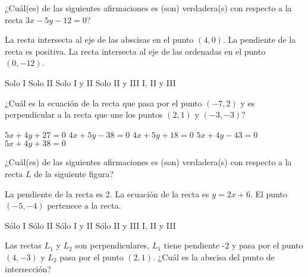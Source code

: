 \documentclass[sin nombre]{srs}
\begin{document}
\begin{preguntas}[after-item-skip=2cm]
\pregunta ¿Cuál(es) de las siguientes afirmaciones es (son) verdadera(s) con respecto a la recta $3x - 5y - 12 = 0$?
\begin{verticali}
\alternativa La recta intersecta al eje de las abscisas en el punto $\left(4, 0\right)$.
\alternativa La pendiente de la recta es positiva.
\alternativa La recta intersecta al eje de las ordenadas en el punto $\left(0, -12\right)$.
\end{verticali}
\begin{vertical}
\alternativa Solo I
\alternativa Solo II
\alternativa Solo I y II
\alternativa Solo II y III
\alternativa I, II y III
\end{vertical}

\pregunta ¿Cuál es la ecuación de la recta que pasa por el punto $\left(-7, 2\right)$ y es perpendicular a la recta que une los puntos $\left(2,1\right)$ y $\left(-3,-3\right)$?
\begin{vertical}
\alternativa $5x + 4y + 27 = 0$
\alternativa $4x + 5y - 38 = 0$
\alternativa $4x + 5y + 18 = 0$
\alternativa $5x + 4y - 43 = 0$
\alternativa $5x + 4y + 38 = 0$
\end{vertical}

\pregunta ¿Cuál(es) de las siguientes afirmaciones es (son) verdadera(s) con respecto a la recta $L$ de la siguiente figura?
\begin{centrado}
\end{centrado}
\begin{verticali}
\alternativa La pendiente de la recta es 2.
\alternativa La ecuación de la recta es $y = 2x + 6$.
\alternativa El punto $\left(-5, -4\right)$ pertenece a la recta.
\end{verticali}
\begin{vertical}
\alternativa Sólo I
\alternativa Sólo II
\alternativa Sólo I y II
\alternativa Sólo II y III
\alternativa I, II y III
\end{vertical}


\pregunta Las rectas $L_1$ y $L_2$ son perpendiculares, $L_1$ tiene pendiente -2 y pasa por el punto $\left(4, -3\right)$ y $L_2$ pasa por el punto $\left(2,1\right)$. ¿Cuál es la abscisa del punto de intersección?
\begin{vertical}
\end{vertical}


\end{preguntas}
\end{document}
